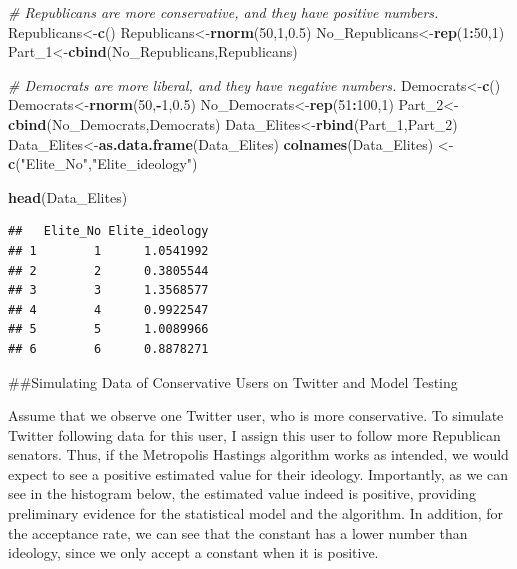 \documentclass[]{book}
\newenvironment{Shaded}{\begin{snugshade}}{\end{snugshade}}
\newcommand{\CommentTok}[1]{\textcolor[rgb]{0.56,0.35,0.01}{\textit{#1}}}
\newcommand{\DecValTok}[1]{\textcolor[rgb]{0.00,0.00,0.81}{#1}}
\newcommand{\FloatTok}[1]{\textcolor[rgb]{0.00,0.00,0.81}{#1}}
\newcommand{\KeywordTok}[1]{\textcolor[rgb]{0.13,0.29,0.53}{\textbf{#1}}}
\newcommand{\NormalTok}[1]{#1}
\newcommand{\OperatorTok}[1]{\textcolor[rgb]{0.81,0.36,0.00}{\textbf{#1}}}
\newcommand{\StringTok}[1]{\textcolor[rgb]{0.31,0.60,0.02}{#1}}
\begin{document}
\begin{Shaded}
\begin{Highlighting}[]
\CommentTok{# Republicans are more conservative, and they have positive numbers.}
\NormalTok{Republicans<-}\KeywordTok{c}\NormalTok{()}
\NormalTok{Republicans<-}\KeywordTok{rnorm}\NormalTok{(}\DecValTok{50}\NormalTok{,}\DecValTok{1}\NormalTok{,}\FloatTok{0.5}\NormalTok{)}
\NormalTok{No_Republicans<-}\KeywordTok{rep}\NormalTok{(}\DecValTok{1}\OperatorTok{:}\DecValTok{50}\NormalTok{,}\DecValTok{1}\NormalTok{)}
\NormalTok{Part_}\DecValTok{1}\NormalTok{<-}\KeywordTok{cbind}\NormalTok{(No_Republicans,Republicans)}

\CommentTok{# Democrats are more liberal, and they have negative numbers.}
\NormalTok{Democrats<-}\KeywordTok{c}\NormalTok{()}
\NormalTok{Democrats<-}\KeywordTok{rnorm}\NormalTok{(}\DecValTok{50}\NormalTok{,}\OperatorTok{-}\DecValTok{1}\NormalTok{,}\FloatTok{0.5}\NormalTok{)}
\NormalTok{No_Democrats<-}\KeywordTok{rep}\NormalTok{(}\DecValTok{51}\OperatorTok{:}\DecValTok{100}\NormalTok{,}\DecValTok{1}\NormalTok{)}
\NormalTok{Part_}\DecValTok{2}\NormalTok{<-}\KeywordTok{cbind}\NormalTok{(No_Democrats,Democrats)}
\NormalTok{Data_Elites<-}\KeywordTok{rbind}\NormalTok{(Part_}\DecValTok{1}\NormalTok{,Part_}\DecValTok{2}\NormalTok{)}
\NormalTok{Data_Elites<-}\KeywordTok{as.data.frame}\NormalTok{(Data_Elites)}
\KeywordTok{colnames}\NormalTok{(Data_Elites) <-}\StringTok{ }\KeywordTok{c}\NormalTok{(}\StringTok{"Elite_No"}\NormalTok{,}\StringTok{"Elite_ideology"}\NormalTok{)}

\KeywordTok{head}\NormalTok{(Data_Elites)}
\end{Highlighting}
\end{Shaded}

\begin{verbatim}
##   Elite_No Elite_ideology
## 1        1      1.0541992
## 2        2      0.3805544
## 3        3      1.3568577
## 4        4      0.9922547
## 5        5      1.0089966
## 6        6      0.8878271
\end{verbatim}

\#\#Simulating Data of Conservative Users on Twitter and Model Testing

Assume that we observe one Twitter user, who is more conservative. To simulate Twitter following data for this user, I assign this user to follow more Republican senators. Thus, if the Metropolis Hastings algorithm works as intended, we would expect to see a positive estimated value for their ideology. Importantly, as we can see in the histogram below, the estimated value indeed is positive, providing preliminary evidence for the statistical model and the algorithm. In addition, for the acceptance rate, we can see that the constant has a lower number than ideology, since we only accept a constant when it is positive.
\end{document}
